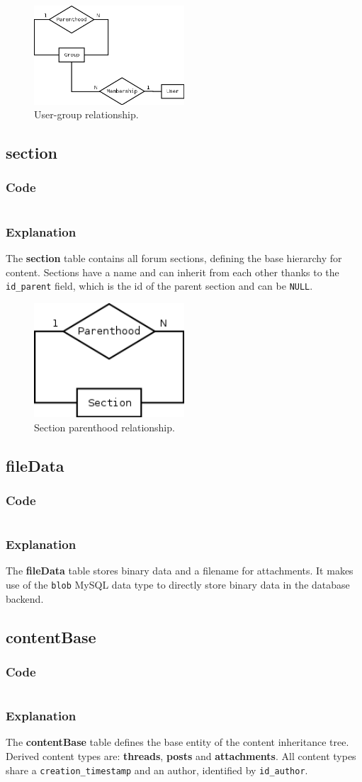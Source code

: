 \documentclass[12pt]{report}
\renewcommand\emph{\textbf}
\newcommand{\printSQLtest}[1]
{
    \inputminted[linenos, breaklines, breakbytoken, tabsize=4, fontsize=\footnotesize]{mysql}{#1}
}
\newcommand{\printSQLTablepage}[2]
{    
    \subsection{#2}
    \subsubsection{Code}
    \printSQLtest{../sql/parts/#1}
    \subsubsection{Explanation}
}
\begin{document}
                    \begin{figure}[!htb]
                    \caption{User-group relationship.}
                    \centering
                    \includegraphics[width=0.5\textwidth]{td/04user}
                    \end{figure}

                \newpage

                \printSQLTablepage{05_tblSection.sql}{section}
                    The \emph{section} table contains all forum sections, defining the base hierarchy for content. Sections have a name and can inherit from each other thanks to the \texttt{id_parent} field, which is the id of the parent section and can be \texttt{NULL}.

                    \begin{figure}[!htb]
                    \caption{Section parenthood relationship.}
                    \centering
                    \includegraphics[width=0.5\textwidth]{td/05section}
                    \end{figure}

                \newpage

                \printSQLTablepage{06_tblFileData.sql}{fileData}
                    The \emph{fileData} table stores binary data and a filename for attachments. It makes use of the \texttt{blob} MySQL data type to directly store binary data in the database backend.

                \newpage

                \printSQLTablepage{07_tblContentBase.sql}{contentBase}
                    The \emph{contentBase} table defines the base entity of the content inheritance tree. Derived content types are: \emph{threads}, \emph{posts} and \emph{attachments}.
                    All content types share a \texttt{creation_timestamp} and an author, identified by \texttt{id_author}.
\end{document}
